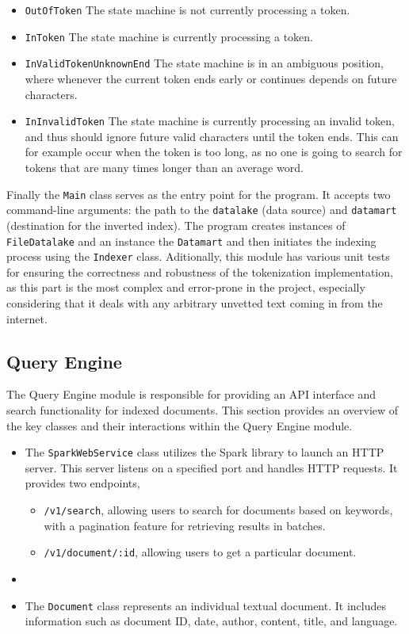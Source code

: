 \documentclass{article}
\begin{document}
\begin{itemize}
\begin{itemize}
	\item \texttt{OutOfToken} The state machine is not currently processing a token.
	\item \texttt{InToken} The state machine is currently processing a token.
	\item \texttt{InValidTokenUnknownEnd} The state machine is in an ambiguous position, where whenever the current token ends early or continues depends on future characters.
	\item \texttt{InInvalidToken} The state machine is currently processing an invalid token, and thus should ignore future valid characters until the token ends.
		This can for example occur when the token is too long, as no one is going to search for tokens that are many times longer than an average word.
\end{itemize}
\end{itemize}

Finally the \texttt{Main} class serves as the entry point for the program. It accepts two command-line arguments: the path to the \texttt{datalake} (data source) and \texttt{datamart} (destination for the inverted index).
The program creates instances of \texttt{FileDatalake} and an instance the \texttt{Datamart} and then initiates the indexing process using the \texttt{Indexer} class.
Aditionally, this module has various unit tests for ensuring the correctness and robustness of the tokenization implementation,
as this part is the most complex and error-prone in the project, especially considering that it deals with any arbitrary unvetted text coming in from the internet.

\subsection{Query Engine}

The Query Engine module is responsible for providing an API interface and search functionality for indexed documents.
This section provides an overview of the key classes and their interactions within the Query Engine module.

\begin{itemize}
\item
The \texttt{SparkWebService} class utilizes the Spark library to launch an HTTP server. This server listens on a specified port and handles HTTP requests. It provides two endpoints,
\begin{itemize}
	\item \texttt{/v1/search}, allowing users to search for documents based on keywords, with a pagination feature for retrieving results in batches.
	\item \texttt{/v1/document/:id}, allowing users to get a particular document.
\end{itemize}
\item

\item 
The \texttt{Document} class represents an individual textual document. It includes information such as document ID, date, author, content, title, and language.
\end{itemize}
\end{document}

